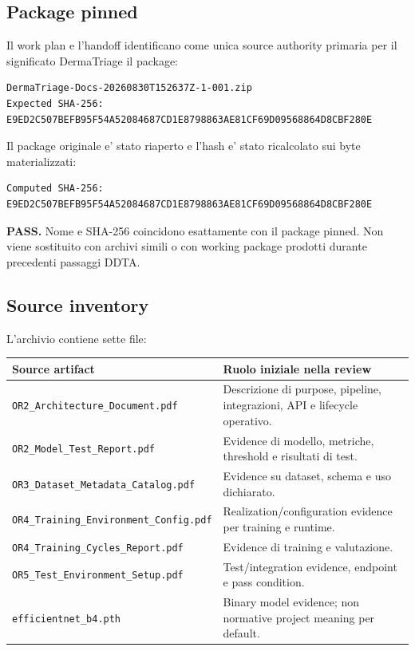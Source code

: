 \documentclass[11pt,a4paper]{article}
\begin{document}
\subsection{Package pinned}

Il work plan e l'handoff identificano come unica source authority primaria per il significato DermaTriage il package:

\begin{lstlisting}
DermaTriage-Docs-20260830T152637Z-1-001.zip
Expected SHA-256:
E9ED2C507BEFB95F54A52084687CD1E8798863AE81CF69D09568864D8CBF280E
\end{lstlisting}

Il package originale e' stato riaperto e l'hash e' stato ricalcolato sui byte materializzati:

\begin{lstlisting}
Computed SHA-256:
E9ED2C507BEFB95F54A52084687CD1E8798863AE81CF69D09568864D8CBF280E
\end{lstlisting}

\begin{ddtacore}[title={A0 disposition}]
\textbf{PASS.} Nome e SHA-256 coincidono esattamente con il package pinned. Non viene sostituito con archivi simili o con working package prodotti durante precedenti passaggi DDTA.
\end{ddtacore}

\subsection{Source inventory}

L'archivio contiene sette file:

\begin{tabularx}{\textwidth}{L{59mm}Y}
\toprule
\textbf{Source artifact} & \textbf{Ruolo iniziale nella review} \\
\midrule
\nolinkurl{OR2_Architecture_Document.pdf} & Descrizione di purpose, pipeline, integrazioni, API e lifecycle operativo. \\
\nolinkurl{OR2_Model_Test_Report.pdf} & Evidence di modello, metriche, threshold e risultati di test. \\
\nolinkurl{OR3_Dataset_Metadata_Catalog.pdf} & Evidence su dataset, schema e uso dichiarato. \\
\nolinkurl{OR4_Training_Environment_Config.pdf} & Realization/configuration evidence per training e runtime. \\
\nolinkurl{OR4_Training_Cycles_Report.pdf} & Evidence di training e valutazione. \\
\nolinkurl{OR5_Test_Environment_Setup.pdf} & Test/integration evidence, endpoint e pass condition. \\
\nolinkurl{efficientnet_b4.pth} & Binary model evidence; non normative project meaning per default. \\
\bottomrule
\end{tabularx}
\end{document}
